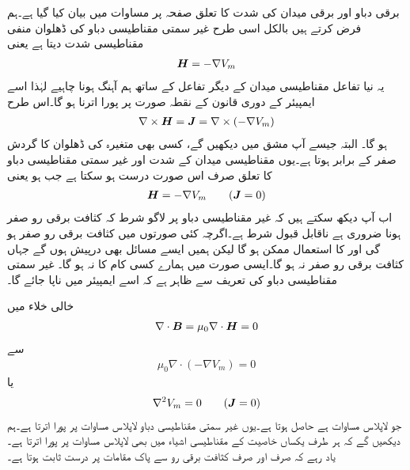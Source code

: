 برقی دباو اور برقی میدان کی شدت کا تعلق صفحہ  پر مساوات  میں بیان کیا گیا ہے۔ہم فرض کرتے ہیں  بالکل اسی طرح غیر سمتی مقناطیسی دباو  کی ڈھلوان منفی مقناطیسی شدت دیتا ہے یعنی
\begin{align*}
{\ensuremath{{\boldsymbol{H}}}}=-\nabla V_m
\end{align*}
یہ نیا تفاعل مقناطیسی میدان کے دیگر تفاعل کے ساتھ ہم آہنگ ہونا چاہیے لہٰذا اسے ایمپیئر کے دوری قانون کے نقطہ صورت پر پورا اترنا ہو گا۔اس طرح
\begin{align}
\nabla \times {\ensuremath{{\boldsymbol{H}}}}={{\boldsymbol{J}}}=\nabla \times \left(-\nabla V_m\right) 
\end{align}
ہو گا۔ البتہ جیسے آپ مشق  میں دیکھیں گے، کسی بھی متغیرہ کی ڈھلوان کا گردش صفر کے برابر ہوتا ہے۔یوں مقناطیسی میدان کے شدت اور غیر سمتی مقناطیسی دباو کا تعلق صرف اس صورت درست ہو سکتا ہے جب  ہو یعنی
\begin{align}\label{مساوات_مقناطیسی_شدت_غیر_سمتی_دباو}
{\ensuremath{{\boldsymbol{H}}}}=-\nabla V_m \quad \quad ({{\boldsymbol{J}}}=0)
\end{align}
اب آپ دیکھ سکتے ہیں کہ غیر مقناطیسی دباو پر لاگو شرط کہ کثافت برقی رو صفر ہونا ضروری ہے ناقابل قبول شرط ہے۔اگرچہ کئی صورتوں میں کثافت برقی رو صفر ہو گی اور  کا استعمال ممکن ہو گا لیکن ہمیں ایسے مسائل بھی درپیش ہوں  گے جہاں کثافت برقی رو صفر نہ ہو گا۔ایسی صورت میں  ہمارے کسی کام کا نہ ہو گا۔ غیر سمتی مقناطیسی دباو  کی تعریف سے ظاہر ہے کہ اسے ایمپیئر میں ناپا جائے گا۔

خالی خلاء میں
\begin{align*}
\nabla \cdot {\ensuremath{{\boldsymbol{B}}}}=\mu_0 \nabla \cdot {\ensuremath{{\boldsymbol{H}}}}=0
\end{align*}
سے
\begin{align*}
\mu_0 \nabla \cdot \left(-\nabla V_m \right)=0
\end{align*}
یا
\begin{align}
\nabla^2 V_m=0 \quad \quad ({{\boldsymbol{J}}}=0)
\end{align}
جو لاپلاس مساوات ہے حاصل ہوتا ہے۔یوں غیر سمتی مقناطیسی دباو لاپلاس مساوات پر پورا اترتا ہے۔ہم دیکھیں گے کہ ہر طرف یکساں خاصیت کے مقناطیسی اشیاء میں بھی  لاپلاس مساوات پر پورا اترتا ہے۔یاد رہے کہ  صرف اور صرف کثافت برقی رو سے پاک مقامات پر درست ثابت ہوتا ہے۔

